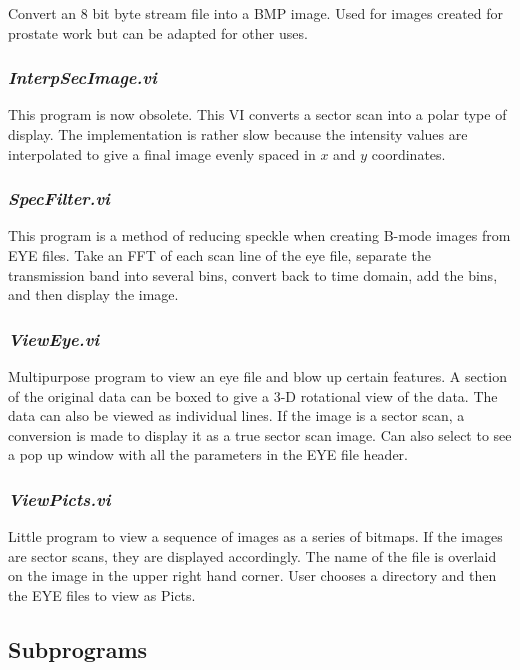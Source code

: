 \documentclass[10pt]{article}
\begin{document}
Convert an 8 bit byte stream file into a BMP image. Used for
images created for prostate work but can be adapted for other
uses.

\subsubsection{{\it InterpSecImage.vi}}

This program is now obsolete. This VI converts a sector scan into
a polar type of display. The implementation is rather slow because
the intensity values are interpolated to give a final image evenly
spaced in $x$ and $y$ coordinates.

\subsubsection{{\it SpecFilter.vi}}

This program is a method of reducing speckle when creating B-mode
images from EYE files. Take an FFT of each scan line of the eye
file, separate the transmission band into several bins, convert
back to time domain, add the bins, and then display the image.

\subsubsection{{\it ViewEye.vi}}

Multipurpose program to view an eye file and blow up certain
features. A section of the original data can be boxed to give a
3-D rotational view of the data. The data can also be viewed as
individual lines. If the image is a sector scan, a conversion is
made to display it as a true sector scan image. Can also select to
see a pop up window with all the parameters in the EYE file
header.

\subsubsection{{\it ViewPicts.vi}}

Little program to view a sequence of images as a series of
bitmaps. If the images are sector scans, they are displayed
accordingly. The name of the file is overlaid on the image in the
upper right hand corner. User chooses a directory and then the EYE
files to view as Picts.



\subsection{Subprograms}
\end{document}
